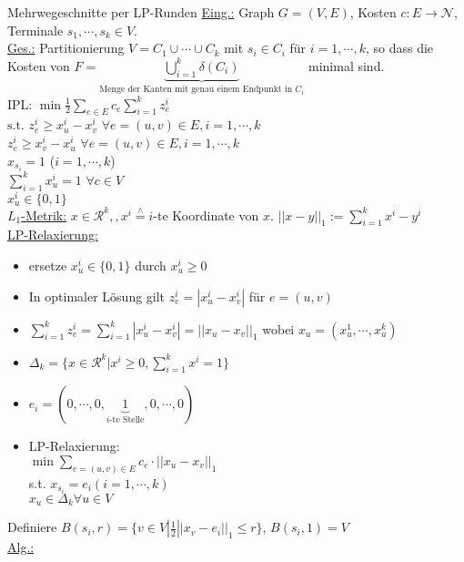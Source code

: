 \begin{section}{Mehrwegeschnitte per LP-Runden}
  \underline{Eing.:} Graph $G =(V,E)$, Kosten $c: E \rightarrow \mathcal{N}$, Terminale $s_1,\cdots,s_k \in V$.\\
  \underline{Ges.:} Partitionierung $V = C_1 \cup \cdots \cup C_k$ mit $s_i \in C_i$ für $i = 1,\cdots,k$, so dass die Kosten von $F=\underbrace{\bigcup_{i=1}^{k} \delta(C_i)}_{\text{Menge der Kanten mit genau einem Endpunkt in }C_i}$ minimal sind.\\
  IPL: $\min \frac{1}{2} \sum_{e\in E} c_e \sum_{i=1}^k z_e^i$\\
      $\text{s.t. } z_e^i \geq x_u^i-x_v^i$   $\forall e=(u,v)\in E, i = 1,\cdots,k$\\
      $z_e^i \geq x_v^i-x_u^i$   $\forall e=(u,v)\in E, i = 1,\cdots,k$\\
      $x_{s_i} = 1$   ($i = 1,\cdots,k$)\\
      $\sum_{i=1}^k x_u^i = 1$   $ \forall c \in V$\\
      $x_u^i \in \{0,1\}$\\     
  \underline{$L_1$-Metrik:} $x\in \mathcal{R}^k,, x^i \overset{\wedge}{=} i$-te Koordinate von $x$. $||x-y||_1 := \sum_{i=1}^k x^i - y^i$\\
  \underline{LP-Relaxierung:} 
  \begin{itemize}
   \item ersetze $x_u^i\in\{0,1\}$ durch $x_u^i\geq 0$
   \item In optimaler Lösung gilt $z_e^i = |x_u^i - x_v^i|$ für $e=(u,v)$
   \item $\sum_{i=1}^k z_e^i = \sum_{i=1}^k |x_u^i - x_v^i| = ||x_u -x_v||_1$ wobei $x_u =(x_u^1,\cdots,x_u^k)$
   \item $\Delta_k = \{x\in\mathcal{R}^k | x^i \geq 0, \sum_{i=1}^k x^i = 1\}$
   \item $e_i = (0,\cdots,0,\underbrace{1}_{i\text{-te Stelle}},0,\cdots,0)$
   \item LP-Relaxierung:\\
   $\min \sum_{e=(u,v)\in E} c_e \cdot ||x_u-x_v||_1$\\
   s.t. $x_{s_i} = e_i (i = 1,\cdots,k)$\\
   $x_u \in \Delta_k \forall u \in V$
  \end{itemize}
  Definiere $B(s_i,r) = \{v\in V | \frac{1}{2} ||x_v - e_i||_1 \leq r\}$, $B(s_i,1) = V$\\
  \underline{Alg.:}\\
  \begin{itemize}

\end{itemize}
\end{section}
